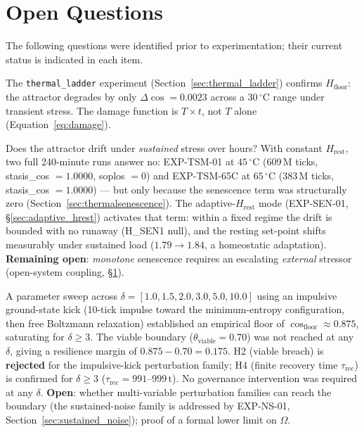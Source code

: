 \documentclass[11pt, a4paper]{article}
\begin{document}
\section{Open Questions}
\label{sec:openq}

The following questions were identified prior to experimentation;
their current status is indicated in each item.

\begin{description}[itemsep=0.55em]

  \item[Q1 -- Thermal response curve (resolved)]
    The \texttt{thermal\_ladder} experiment (Section~\ref{sec:thermal_ladder})
    confirms $H_\text{floor}$: the attractor degrades by only $\Delta\cos = 0.0023$
    across a $30\,^\circ\mathrm{C}$ range under transient stress.
    The damage function is $T \times t$, not $T$ alone (Equation~\ref{eq:damage}).

  \item[Q2 -- Thermal senescence (addressed; adaptive $H_\text{rest}$ tested)]
    Does the attractor drift under \emph{sustained} stress over hours?
    With constant $H_\text{rest}$, two full 240-minute runs answer no:
    EXP-TSM-01 at $45\,^\circ\mathrm{C}$ (609\,M ticks, stasis\_cos $= 1.0000$,
    soplos $= 0$) and EXP-TSM-65C at $65\,^\circ\mathrm{C}$ (383\,M ticks,
    stasis\_cos $= 1.0000$) --- but only because the senescence term was
    structurally zero (Section~\ref{sec:thermalsenescence}).
    The adaptive-$H_\text{rest}$ mode (EXP-SEN-01, \S\ref{sec:adaptive_hrest})
    activates that term: within a fixed regime the drift is bounded with no
    runaway (H\_SEN1 null), and the resting set-point shifts measurably under
    sustained load ($1.79\!\to\!1.84$, a homeostatic adaptation).
    \textbf{Remaining open}: \emph{monotone} senescence requires an escalating
    \emph{external} stressor (open-system coupling, \S\ref{sec:openq}).

  \item[Q3 -- Basin floor under extreme perturbation (EXP-AB-01, 2026-04-27)]
    A parameter sweep across $\delta = [1.0, 1.5, 2.0, 3.0, 5.0, 10.0]$
    using an impulsive ground-state kick (10-tick impulse toward the
    minimum-entropy configuration, then free Boltzmann relaxation) established
    an empirical floor of $\cos_\text{floor} \approx 0.875$, saturating for
    $\delta \geq 3$.
    The viable boundary ($\theta_\text{viable} = 0.70$) was not reached at
    any $\delta$, giving a resilience margin of $0.875 - 0.70 = 0.175$.
    H2 (viable breach) is \textbf{rejected} for the impulsive-kick perturbation
    family; H4 (finite recovery time $\tau_\text{rec}$) is confirmed for
    $\delta \geq 3$ ($\tau_\text{rec} = 991$--$999\,\text{t}$).
    No governance intervention was required at any $\delta$.
    \textbf{Open}: whether multi-variable perturbation families can reach the
    boundary (the sustained-noise family is addressed by EXP-NS-01,
    Section~\ref{sec:sustained_noise}); proof of a formal lower limit on $\Omega$.


\end{description}
\end{document}
